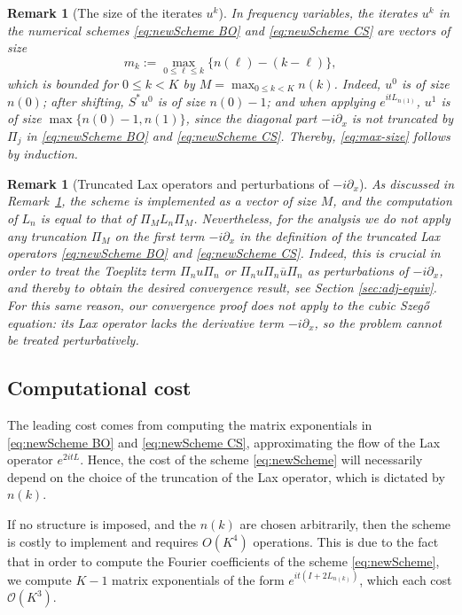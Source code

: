 \documentclass [11pt] {article}
\newtheorem{rem}[thm]{Remark}
\newcommand{\be}{\begin{equation}}
\newcommand{\ee}{\end{equation}}
\newcommand{\<}{\langle}
\renewcommand{\>}{\rangle}
\newcommand{\ol}[1]{\overline{#1}}
\begin{document}
\begin{rem}[The size of the iterates $u^k$]\label{rem:size-uk}
In frequency variables,
the iterates $u^k$ in the numerical schemes \eqref{eq:newScheme BO} and \eqref{eq:newScheme CS} are
 vectors
of size
\be\label{eq:max-size}
m_k := \max_{0\le \ell \le k}\{ n(\ell)-(k-\ell)\},
\ee
which is bounded for $0\le k <K$ by $M = \max_{0\le k < K}n(k)$. 
Indeed, $u^{0}$ is of size $n(0)$; after shifting, $S^{*}u^0$ is of size $n(0)-1$; and when applying $e^{itL_{n(1)}}$, $u^1$ is of size $\max\{ n(0)-1, n(1)\}$, since the diagonal part $-i\partial_x$ is not truncated by $\Pi_j$ in \eqref{eq:newScheme BO} and \eqref{eq:newScheme CS}. Thereby, \eqref{eq:max-size} follows by induction.
\end{rem}

\begin{rem}[Truncated Lax operators and perturbations of $-i\partial_x$]\label{rem:perturbation}
As discussed in Remark~\ref{rem:size-uk}, the scheme is implemented as a vector of size $M$, and the computation of $L_n$ is equal to that of $\Pi_M L_n \Pi_M$. Nevertheless, for the analysis we do not apply any truncation $\Pi_M$ on the first term $-i\partial_x$ in the definition of the truncated Lax operators \eqref{eq:newScheme BO} and \eqref{eq:newScheme CS}. Indeed, this is crucial in order to treat the Toeplitz term $\Pi_nu\Pi_n$ or $\Pi_{n}u\Pi_{n}\ol u \Pi_n $ as perturbations of $-i\partial_x$, and thereby to obtain the desired convergence result, see Section \ref{sec:adj-equiv}. For this same reason, our convergence proof does not apply to the cubic Szeg\H o equation: its Lax operator lacks the derivative term $-i\partial_x$, so the problem cannot be treated perturbatively.
\end{rem}


\subsection{Computational cost}\label{sec:CPU}
The leading cost comes from computing the matrix exponentials in \eqref{eq:newScheme BO} and \eqref{eq:newScheme CS}, approximating the flow of the Lax operator $e^{2itL}$.
Hence, the cost of the scheme \eqref{eq:newScheme} will necessarily depend on the choice of the truncation of the Lax operator, which is dictated by $n(k)$. 

If no structure is imposed, and the $n(k)$ are chosen arbitrarily, then the scheme is costly to implement and requires $O(K^4)$ operations. This is due to the fact that in order to compute the Fourier coefficients of the scheme \eqref{eq:newScheme}, we compute $K-1$ matrix exponentials of the form $e^{it(I + 2L_{n(k)})}$, which each cost $\mathcal O(K^3)$.
\end{document}
